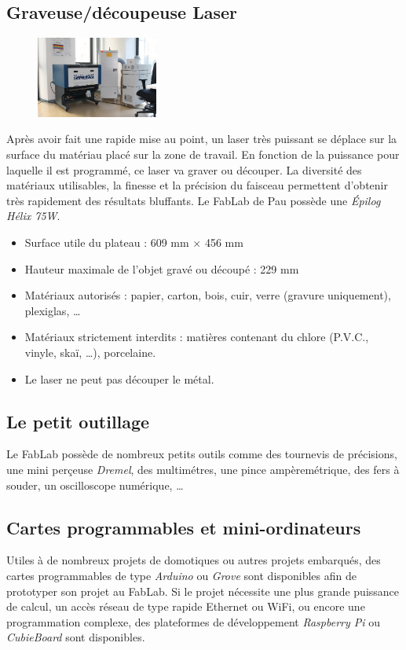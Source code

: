 \subsection{Graveuse/découpeuse Laser}
\begin{figure}
\centering
    \includegraphics[width=40mm]{Epilog.jpg}
    \label{fig:decoupeuselaser}
\end{figure}
Après avoir fait une rapide mise au point, un laser très puissant se déplace sur la surface du matériau placé sur la zone de travail. En fonction de la puissance pour laquelle il est programmé, ce laser va graver ou découper. La diversité des matériaux utilisables, la finesse et la précision du faisceau permettent d'obtenir très rapidement des résultats bluffants.
Le FabLab de Pau possède une \textit{Épilog Hélix 75W}.

\begin{itemize}
  \item Surface utile du plateau : 609 mm $\times$ 456 mm
  \item Hauteur maximale de l'objet gravé ou découpé : 229 mm
  \item Matériaux autorisés : papier, carton, bois, cuir, verre (gravure uniquement), plexiglas, \dots
  \item Matériaux strictement interdits : matières contenant du chlore (P.V.C., vinyle, skaï, \dots), porcelaine.
  \item Le laser ne peut pas découper le métal.
\end{itemize}

\subsection{Le petit outillage}
Le FabLab possède de nombreux petits outils comme des tournevis de précisions, une mini perçeuse \textit{Dremel}, des multimétres, une pince ampèremétrique, des fers à souder, un oscilloscope numérique, \dots

\subsection{Cartes programmables et mini-ordinateurs}
Utiles à de nombreux projets de domotiques ou autres projets embarqués, des cartes programmables de type \textit{Arduino} ou \textit{Grove} sont disponibles afin de prototyper son projet au FabLab. Si le projet nécessite une plus grande puissance de calcul, un accès réseau de type rapide Ethernet ou WiFi, ou encore une programmation complexe, des plateformes de développement \textit{Raspberry Pi} ou \textit{CubieBoard} sont disponibles.

